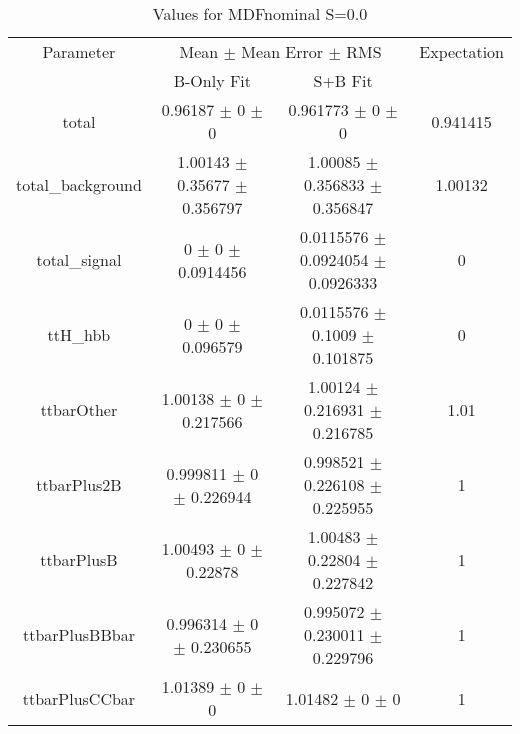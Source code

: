 \begin{table}
\centering
\caption{Values for MDFnominal S=0.0}
\begin{tabular}{cccc}
\toprule
Parameter & \multicolumn{2}{c}{Mean $\pm$ Mean Error $\pm$ RMS} & Expectation\\
 & B-Only Fit & S+B Fit & \\
\midrule
total & \num{0.96187} $\pm$ \num{0} $\pm$ \num{0} & \num{0.961773} $\pm$ \num{0} $\pm$ \num{0} & \num{0.941415}\\
total\_background & \num{1.00143} $\pm$ \num{0.35677} $\pm$ \num{0.356797} & \num{1.00085} $\pm$ \num{0.356833} $\pm$ \num{0.356847} & \num{1.00132}\\
total\_signal & \num{0} $\pm$ \num{0} $\pm$ \num{0.0914456} & \num{0.0115576} $\pm$ \num{0.0924054} $\pm$ \num{0.0926333} & \num{0}\\
ttH\_hbb & \num{0} $\pm$ \num{0} $\pm$ \num{0.096579} & \num{0.0115576} $\pm$ \num{0.1009} $\pm$ \num{0.101875} & \num{0}\\
ttbarOther & \num{1.00138} $\pm$ \num{0} $\pm$ \num{0.217566} & \num{1.00124} $\pm$ \num{0.216931} $\pm$ \num{0.216785} & \num{1.01}\\
ttbarPlus2B & \num{0.999811} $\pm$ \num{0} $\pm$ \num{0.226944} & \num{0.998521} $\pm$ \num{0.226108} $\pm$ \num{0.225955} & \num{1}\\
ttbarPlusB & \num{1.00493} $\pm$ \num{0} $\pm$ \num{0.22878} & \num{1.00483} $\pm$ \num{0.22804} $\pm$ \num{0.227842} & \num{1}\\
ttbarPlusBBbar & \num{0.996314} $\pm$ \num{0} $\pm$ \num{0.230655} & \num{0.995072} $\pm$ \num{0.230011} $\pm$ \num{0.229796} & \num{1}\\
ttbarPlusCCbar & \num{1.01389} $\pm$ \num{0} $\pm$ \num{0} & \num{1.01482} $\pm$ \num{0} $\pm$ \num{0} & \num{1}\\
\bottomrule
\end{tabular}
\end{table}